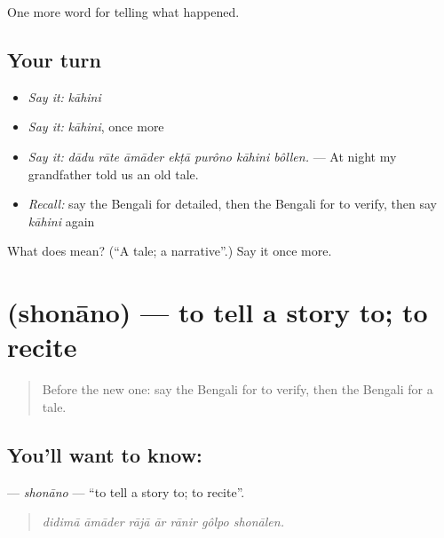 \begin{grammarlens}[title={What you've built}]
One more word for telling what happened.
\end{grammarlens}

\subsection*{Your turn}
\begin{itemize}
\raggedright
  \item \emph{Say it:} \emph{kāhini}
  \item \emph{Say it:} \emph{kāhini}, once more
  \item \emph{Say it:} \emph{dādu rāte āmāder ekṭā purôno kāhini bôllen.} — At night my grandfather told us an old tale.
  \item \emph{Recall:} say the Bengali for detailed, then the Bengali for to verify, then say \emph{kāhini} again
\end{itemize}

\begin{tcolorbox}[breakable,colback=teal!4,colframe=teal!35!black,title={Before you move on}]
What does  mean? (\textquotedblleft{}A tale; a narrative\textquotedblright{}.) Say it once more.
\end{tcolorbox}
\section[\texorpdfstring{\bn{শোনানো} (shonāno)}{শোনানো (shonāno)}]{ (shonāno) — to tell a story to; to recite}

\label{lesson:BN-C302-shonano}



\begin{quote}
Before the new one: say the Bengali for to verify, then the Bengali for a tale.
\end{quote}

\subsection*{You'll want to know: }
\textbf{} — \emph{shonāno} — \textquotedblleft{}to tell a story to; to recite\textquotedblright{}.

\begin{quote}
      
\end{quote}

\begin{quote}
\emph{didimā āmāder rājā ār rānir gôlpo shonālen.}
\end{quote}

